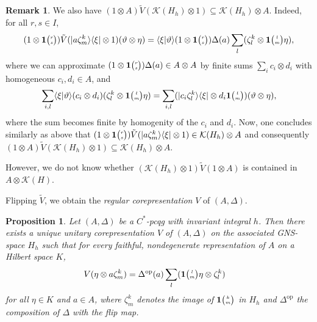 \documentclass[11pt]{article}
\DeclareMathOperator{\op}{\mathrm{op}}
\newcommand{\Grt}[3]{#1{\tiny {\begin{pmatrix} #2\\#3\end{pmatrix}}}}
\newcommand{\UnitC}[2]{\Grt{\mathbf{1}}{#1}{#2}}
\newtheorem{Prop}[Theorem]{Proposition}
\theoremstyle{definition}
\newtheorem{Rem}[Theorem]{Remark}
\numberwithin{equation}{section}
\begin{document}
\begin{Rem}
  We also have $(1 \otimes A)\tilde V(\mathcal{K}(H_{h})\otimes 1)
  \subseteq \mathcal{K}(H_{h}) \otimes A$. Indeed, for all $r,s\in I$,
   \begin{align*}
     (1 \otimes \UnitC{r}{s})\tilde
     V(|a\zeta^{k}_{m}\rangle\langle\xi|\otimes 1)(\vartheta \otimes
     \eta) = \langle \xi|\vartheta \rangle(1 \otimes
     \UnitC{r}{s})\Delta(a) \sum_{l} (\zeta^{k}_{l} \otimes
     \UnitC{l}{m}\eta),
   \end{align*}
where we can approximate $(1
   \otimes \UnitC{r}{s})\Delta(a) \in A\otimes A$ by finite sums
   $\sum_{i} c_{i} \otimes d_{i}$ with homogeneous $c_{i},d_{i} \in
   A$, and
   \begin{align*}
     \sum_{i,l} \langle \xi|\vartheta\rangle (c_{i} \otimes d_{i})(\zeta^{k}_{l} \otimes
     \UnitC{l}{m} \eta) = \sum_{i,l} (|c_{i}\zeta^{k}_{l}\rangle\langle \xi| \otimes
     d_{i}\UnitC{l}{m}) (\vartheta \otimes \eta),
   \end{align*}
   where the sum becomes finite by homogenity of the $c_{i}$ and $d_{i}$. Now, one concludes
   similarly as above that $(1 \otimes \UnitC{r}{s})\tilde
   V(|a\zeta^{k}_{m}\rangle\langle\xi|\otimes 1) \in \mathcal{K}(H_{h}) \otimes A$ and consequently
   $(1\otimes A)\tilde V(\mathcal{K}(H_{h}) \otimes 1) \subseteq \mathcal{K}(H_{h}) \otimes A$.
   
However,   we do not know whether $(\mathcal{K}(H_{h}) \otimes 1)
   \tilde V(1\otimes A)$ is contained in $A\otimes \mathcal{K}(H)$.
\end{Rem}
Flipping $\tilde V$, we obtain the \emph{regular corepresentation} $V$ of $(A,\Delta)$.
 \begin{Prop}
Let $(A,\Delta)$ be a $C^{*}$-pcqg with invariant integral $h$. Then there exists a unique unitary
corepresentation $V$ of $(A,\Delta)$ on the associated GNS-space
$H_{h}$ such that for every faithful, nondegenerate representation of
$A$ on a Hilbert space $K$,
\begin{align*}
  V(\eta  \otimes a\zeta^{k}_{m}) &= \Delta^{\op}(a) \sum_{l}(\UnitC{l}{m}\eta
  \otimes \zeta^{k}_{l})
\end{align*}
for all $\eta\in K$ and $a\in A$, where $\zeta^{k}_{m}$ denotes the
image of  $\UnitC{k}{m}$ in $H_{h}$ and $\Delta^{\op}$ the composition
of $\Delta$ with the flip map.
 \end{Prop}
\end{document}
